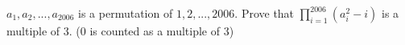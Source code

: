 $a_1, a_2,...,a_{2006}$ is a permutation of $1,2,...,2006$.
Prove that $\prod_{i = 1}^{2006} (a_{i}^2-i) $ is a multiple of $3$. ($0$ is counted as a multiple of $3$)